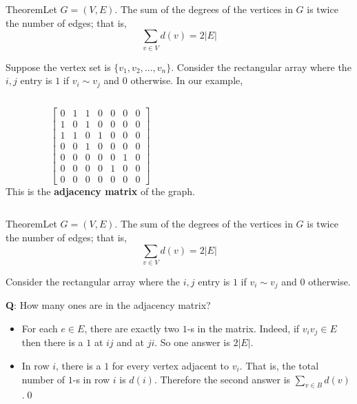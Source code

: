 \documentclass{beamer}
\def\bl[#1]#2{\begin{block}{#1}#2\end{block}}
\def\itemb{\begin{itemize}}
\def\iteme{\end{itemize}}
\begin{document}
\begin{frame}
\bl[Theorem]{Let $G=(V,E)$. The sum of the degrees of the vertices in $G$ is twice the number of edges; that is,
\[
\sum_{v\in V}d(v)=2|E|
\]}
Suppose the vertex set is $\{v_1,v_2,\dots,v_n\}$. Consider the rectangular array where the $i,j$ entry is $1$ if $v_{i}\sim v_j$ and $0$ otherwise. In our example,
\begin{columns}
\[
\left[\begin{array}{ccccccc}
0&1&1&0&0&0&0\\
1&0&1&0&0&0&0\\
1&1&0&1&0&0&0\\
0&0&1&0&0&0&0\\
0&0&0&0&0&1&0\\
0&0&0&0&1&0&0\\
0&0&0&0&0&0&0
\end{array}\right]
\]
This is the \textbf{adjacency matrix} of the graph.
\end{columns}
\end{frame}

\begin{frame}
\bl[Theorem]{Let $G=(V,E)$. The sum of the degrees of the vertices in $G$ is twice the number of edges; that is,
\[
\sum_{v\in V}d(v)=2|E|
\]}
Consider the rectangular array where the $i,j$ entry is $1$ if $v_{i}\sim v_j$ and $0$ otherwise.\vspace{0.2cm}

\textbf{Q}: How many ones are in the adjacency matrix?
\itemb
\item For each $e\in E$, there are exactly two $1$-s in the matrix. Indeed, if $v_iv_j\in E$ then there is a $1$ at $ij$ and at $ji$. So one answer is $2|E|$.
\item In row $i$, there is a $1$ for every vertex adjacent to $v_i$. That is, the total number of $1$-s in row $i$ is $d(i)$. Therefore the second answer is $\sum_{v\in B}d(v)$.\qed
\iteme
\end{frame}
\end{document}
